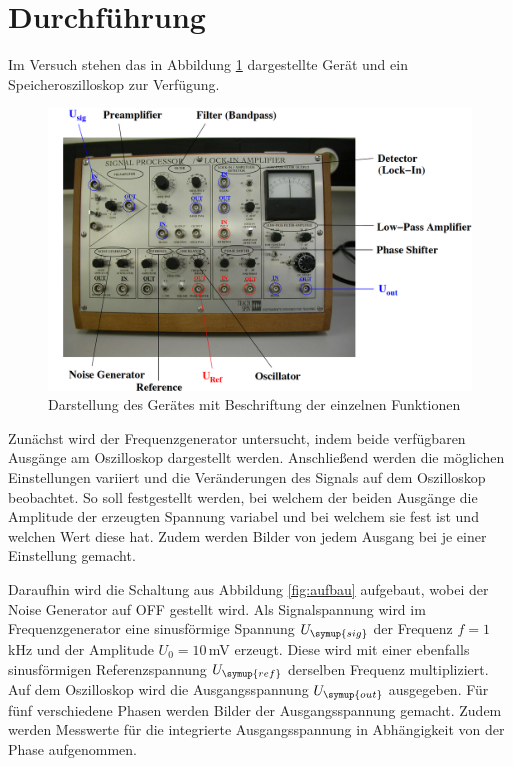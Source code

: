 \section{Durchführung}
\label{sec:Durchführung}
Im Versuch stehen das in Abbildung \ref{fig:geraet} dargestellte Gerät und ein
Speicheroszilloskop zur Verfügung.

\begin{figure}
  \centering
  \includegraphics[width=\textwidth]{data/geraet.png}
  \caption{Darstellung des Gerätes mit Beschriftung der einzelnen Funktionen
  \cite{Versuchsanleitung}}
  \label{fig:geraet}
\end{figure}


Zunächst wird der Frequenzgenerator untersucht, indem beide verfügbaren
Ausgänge am Oszilloskop dargestellt werden. Anschließend werden die möglichen Einstellungen
variiert und die Veränderungen des Signals auf dem Oszilloskop beobachtet. So soll
festgestellt werden, bei welchem der beiden Ausgänge die Amplitude der erzeugten
Spannung variabel und bei welchem sie fest ist und welchen Wert diese hat. Zudem
werden Bilder von jedem Ausgang bei je einer Einstellung gemacht.

Daraufhin wird die Schaltung aus Abbildung \ref{fig:aufbau} aufgebaut, wobei der Noise Generator
auf OFF gestellt wird. Als Signalspannung wird im Frequenzgenerator eine sinusförmige Spannung
$U_{\symup{sig}}$ der Frequenz $f=1$\,kHz und der Amplitude $U_0=10$\,mV erzeugt.
Diese wird mit  einer ebenfalls sinusförmigen Referenzspannung $U_{\symup{ref}}$
derselben Frequenz multipliziert. Auf dem Oszilloskop wird die Ausgangsspannung
$U_{\symup{out}}$ ausgegeben. Für fünf verschiedene Phasen werden Bilder der
Ausgangsspannung gemacht. Zudem werden Messwerte für die integrierte Ausgangsspannung
in Abhängigkeit von der Phase aufgenommen.


